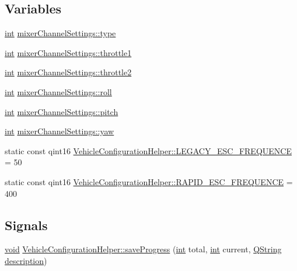 \subsection*{Variables}
\begin{DoxyCompactItemize}
\item 
\hyperlink{ioapi_8h_a787fa3cf048117ba7123753c1e74fcd6}{int} \hyperlink{group___vehicle_configuration_helper_gae266726733ea9753d4b40ababc4ed7dd}{mixer\-Channel\-Settings\-::type}
\item 
\hyperlink{ioapi_8h_a787fa3cf048117ba7123753c1e74fcd6}{int} \hyperlink{group___vehicle_configuration_helper_ga938151d1ab96457978b7689a772b1d2f}{mixer\-Channel\-Settings\-::throttle1}
\item 
\hyperlink{ioapi_8h_a787fa3cf048117ba7123753c1e74fcd6}{int} \hyperlink{group___vehicle_configuration_helper_gaaa198e94e22ad3c7474bef8972c5e73d}{mixer\-Channel\-Settings\-::throttle2}
\item 
\hyperlink{ioapi_8h_a787fa3cf048117ba7123753c1e74fcd6}{int} \hyperlink{group___vehicle_configuration_helper_ga41061bf67fafdf170291f3a518268645}{mixer\-Channel\-Settings\-::roll}
\item 
\hyperlink{ioapi_8h_a787fa3cf048117ba7123753c1e74fcd6}{int} \hyperlink{group___vehicle_configuration_helper_gac604b2322be856866e658f6fba34c7f7}{mixer\-Channel\-Settings\-::pitch}
\item 
\hyperlink{ioapi_8h_a787fa3cf048117ba7123753c1e74fcd6}{int} \hyperlink{group___vehicle_configuration_helper_ga16a724da7162ceb2c56798d864dac807}{mixer\-Channel\-Settings\-::yaw}
\item 
static const qint16 \hyperlink{group___vehicle_configuration_helper_ga1ab33357e7669d7825cadb88ff666f98}{Vehicle\-Configuration\-Helper\-::\-L\-E\-G\-A\-C\-Y\-\_\-\-E\-S\-C\-\_\-\-F\-R\-E\-Q\-U\-E\-N\-C\-E} = 50
\item 
static const qint16 \hyperlink{group___vehicle_configuration_helper_ga5bdfa86a19f74eae8f6b44ac63d640f2}{Vehicle\-Configuration\-Helper\-::\-R\-A\-P\-I\-D\-\_\-\-E\-S\-C\-\_\-\-F\-R\-E\-Q\-U\-E\-N\-C\-E} = 400
\end{DoxyCompactItemize}
\subsection*{Signals}
\begin{DoxyCompactItemize}
\item 
\hyperlink{group___u_a_v_objects_plugin_ga444cf2ff3f0ecbe028adce838d373f5c}{void} \hyperlink{group___vehicle_configuration_helper_ga7ec52f13c4dee3a474698106c2ca3bf4}{Vehicle\-Configuration\-Helper\-::save\-Progress} (\hyperlink{ioapi_8h_a787fa3cf048117ba7123753c1e74fcd6}{int} total, \hyperlink{ioapi_8h_a787fa3cf048117ba7123753c1e74fcd6}{int} current, \hyperlink{group___u_a_v_objects_plugin_gab9d252f49c333c94a72f97ce3105a32d}{Q\-String} \hyperlink{sdlgamepad_8dox_ae82208d022e4246ddf1e4f481a3f81b0}{description})
\end{DoxyCompactItemize}


